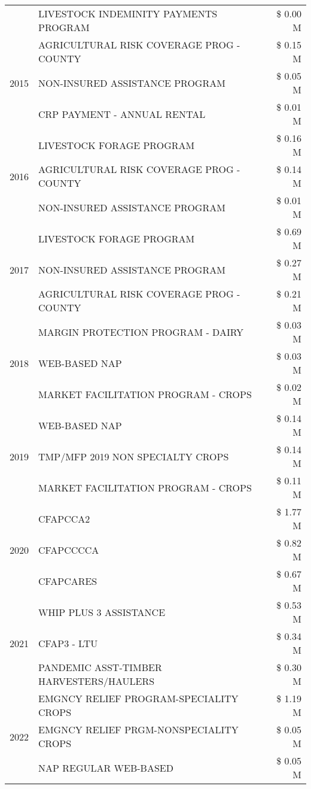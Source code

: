 \begin{tabular}{llr}
 & LIVESTOCK INDEMINITY PAYMENTS PROGRAM & \$ 0.00 M \\
\cline{1-3}
\multirow[t]{3}{*}{2015} & AGRICULTURAL RISK COVERAGE PROG - COUNTY & \$ 0.15 M \\
 & NON-INSURED ASSISTANCE PROGRAM & \$ 0.05 M \\
 & CRP PAYMENT - ANNUAL RENTAL & \$ 0.01 M \\
\cline{1-3}
\multirow[t]{3}{*}{2016} & LIVESTOCK FORAGE PROGRAM & \$ 0.16 M \\
 & AGRICULTURAL RISK COVERAGE PROG - COUNTY & \$ 0.14 M \\
 & NON-INSURED ASSISTANCE PROGRAM & \$ 0.01 M \\
\cline{1-3}
\multirow[t]{3}{*}{2017} & LIVESTOCK FORAGE PROGRAM & \$ 0.69 M \\
 & NON-INSURED ASSISTANCE PROGRAM & \$ 0.27 M \\
 & AGRICULTURAL RISK COVERAGE PROG - COUNTY & \$ 0.21 M \\
\cline{1-3}
\multirow[t]{3}{*}{2018} & MARGIN PROTECTION PROGRAM - DAIRY & \$ 0.03 M \\
 & WEB-BASED NAP & \$ 0.03 M \\
 & MARKET FACILITATION PROGRAM - CROPS & \$ 0.02 M \\
\cline{1-3}
\multirow[t]{3}{*}{2019} & WEB-BASED NAP & \$ 0.14 M \\
 & TMP/MFP 2019 NON SPECIALTY CROPS & \$ 0.14 M \\
 & MARKET FACILITATION PROGRAM - CROPS & \$ 0.11 M \\
\cline{1-3}
\multirow[t]{3}{*}{2020} & CFAPCCA2 & \$ 1.77 M \\
 & CFAPCCCCA & \$ 0.82 M \\
 & CFAPCARES & \$ 0.67 M \\
\cline{1-3}
\multirow[t]{3}{*}{2021} & WHIP PLUS 3 ASSISTANCE & \$ 0.53 M \\
 & CFAP3 - LTU & \$ 0.34 M \\
 & PANDEMIC ASST-TIMBER HARVESTERS/HAULERS & \$ 0.30 M \\
\cline{1-3}
\multirow[t]{3}{*}{2022} & EMGNCY RELIEF PROGRAM-SPECIALITY CROPS & \$ 1.19 M \\
 & EMGNCY RELIEF PRGM-NONSPECIALITY CROPS & \$ 0.05 M \\
 & NAP REGULAR WEB-BASED & \$ 0.05 M \\
\cline{1-3}
\bottomrule
\end{tabular}
